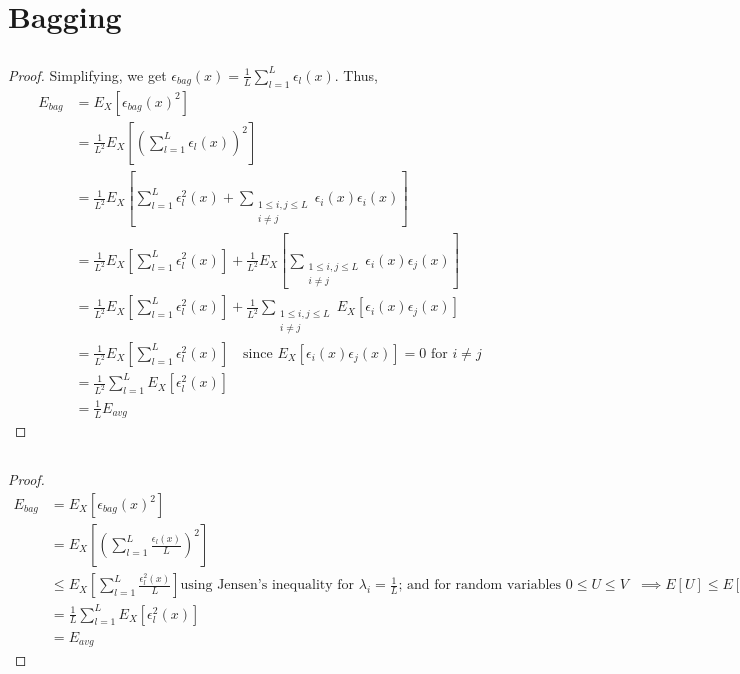 \documentclass{article}
\begin{document}
\newpage


\section{Bagging}
\subsection{}
\begin{proof}
	
Simplifying, we get $\epsilon_{bag}(x) = \frac{1}{L}\sum\limits_{l=1}^L \epsilon_l(x)$. Thus,
\begin{equation}
  \label{eq:1.2}
  \begin{split}
	  E_{bag} &= E_X\left[\epsilon_{bag}(x)^2\right] \\
	          &= \frac{1}{L^2}E_X\left[\left(\sum_{l=1}^L \epsilon_l(x)\right)^2\right] \\
			  &= \frac{1}{L^2}E_X\left[\sum_{l=1}^L \epsilon_l^2(x) + \sum_{\substack{1\leq i,j\leq L \\ i \neq j}}\epsilon_i(x)\epsilon_i(x) \right] \\
			  &= \frac{1}{L^2}E_X\left[\sum_{l=1}^L \epsilon_l^2(x)\right]+ \frac{1}{L^2}E_X\left[\sum_{\substack{1\leq i,j\leq L \\ i \neq j}}\epsilon_i(x)\epsilon_j(x) \right] \\
			  &= \frac{1}{L^2}E_X\left[\sum_{l=1}^L \epsilon_l^2(x)\right]+ \frac{1}{L^2}\sum_{\substack{1\leq i,j\leq L \\ i \neq j}}E_X\left[\epsilon_i(x)\epsilon_j(x) \right] \\
			  &= \frac{1}{L^2}E_X\left[\sum_{l=1}^L \epsilon_l^2(x)\right] \quad \text{since $E_X\left[\epsilon_i(x)\epsilon_j(x)\right]=0$ for $i \neq j$} \\
			  &= \frac{1}{L^2} \sum_{l=1}^L E_X\left[ \epsilon_l^2(x)\right] \\
			  &= \frac{1}{L}E_{avg}
  \end{split}
\end{equation}
\end{proof}


\subsection{}
\begin{proof}
\begin{equation}
  \label{eq:1.3}
  \begin{split}
	  E_{bag} &= E_X\left[\epsilon_{bag}(x)^2\right] \\
	          &= E_X\left[\left(\sum_{l=1}^L \frac{\epsilon_l(x)}{L}\right)^2\right] \\
			  &\leq E_X\left[\sum_{l=1}^L \frac{\epsilon_l^2(x)}{L}\right] \text{using Jensen's inequality for $\lambda_i = \frac{1}{L}$; and for random variables $0\leq U\leq V$ $\implies E[U] \leq E[V]$ } \\
			  &= \frac{1}{L}\sum_{l=1}^L E_X\left[ \epsilon_l^2(x)\right] \\
			  &= E_{avg}
  \end{split}
\end{equation}
\end{proof}
\end{document}
